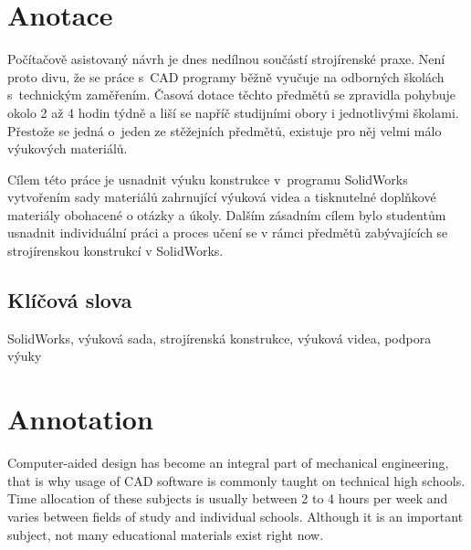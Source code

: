 \documentclass{template/socthesis}
\author{Petr Štourač}
\begin{document}

\maketitle




\pagestyle{empty}


\section*{Anotace}
Počítačově asistovaný návrh je dnes nedílnou součástí strojírenské praxe.
Není proto divu, že se práce s~CAD programy běžně vyučuje na odborných školách s~technickým zaměřením.
Časová dotace těchto předmětů se zpravidla pohybuje okolo 2 až 4 hodin týdně a liší se napříč studijními obory i jednotlivými školami.
Přestože se jedná o~jeden ze stěžejních předmětů, existuje pro něj velmi málo výukových materiálů.

Cílem této práce je usnadnit výuku konstrukce v~programu SolidWorks vytvořením sady materiálů zahrnující výuková videa a tisknutelné doplňkové materiály obohacené o otázky a úkoly.
Dalším zásadním cílem bylo studentům usnadnit individuální práci a proces učení se v rámci předmětů zabývajících se strojírenskou konstrukcí v SolidWorks. 

\subsection*{Klíčová slova}
SolidWorks, výuková sada, strojírenská konstrukce, výuková videa, podpora výuky

\section*{Annotation}
Computer-aided design has become an integral part of mechanical engineering, that is why usage of CAD software is commonly taught on technical high schools.
Time allocation of these subjects is usually between 2 to 4 hours per week and varies between fields of study and individual schools. 
Although it is an important subject, not many educational materials exist right now.
\end{document}

